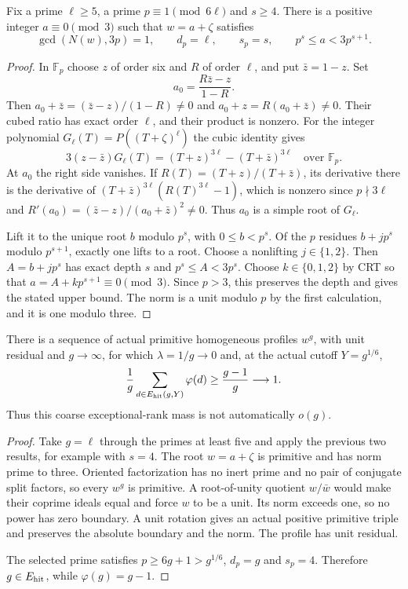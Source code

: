 \begin{theorem}\label{hr-depth}
Fix a prime $\ell\ge5$, a prime $p\equiv1\pmod{6\ell}$ and $s\ge4$.
There is a positive integer $a\equiv0\pmod3$ such that $w=a+\zeta$
satisfies
\[
 \gcd(N(w),3p)=1,\qquad d_p=\ell,\qquad s_p=s,
 \qquad p^s\le a<3p^{s+1}.
\]
\end{theorem}
\begin{proof}
In $\mathbb F_p$ choose $z$ of order six and $R$ of order $\ell$,
and put $\bar z=1-z$. Set
\[
 a_0=\frac{R\bar z-z}{1-R}.
\]
Then $a_0+\bar z=(\bar z-z)/(1-R)\ne0$ and
$a_0+z=R(a_0+\bar z)\ne0$. Their cubed ratio has exact order
$\ell$, and their product is nonzero. For the integer polynomial
$G_\ell(T)=P((T+\zeta)^\ell)$ the cubic identity gives
\[
 3(z-\bar z)G_\ell(T)=(T+z)^{3\ell}-(T+\bar z)^{3\ell}
 \quad\text{over }\mathbb F_p.
\]
At $a_0$ the right side vanishes. If $R(T)=(T+z)/(T+\bar z)$,
its derivative there is the derivative of
$(T+\bar z)^{3\ell}(R(T)^{3\ell}-1)$, which is nonzero since
$p\nmid3\ell$ and
$R'(a_0)=(\bar z-z)/(a_0+\bar z)^2\ne0$.
Thus $a_0$ is a simple root of $G_\ell$.

Lift it to the unique root $b$ modulo $p^s$, with $0\le b<p^s$.
Of the $p$ residues $b+jp^s$ modulo $p^{s+1}$, exactly one lifts
to a root. Choose a nonlifting $j\in\{1,2\}$. Then
$A=b+jp^s$ has exact depth $s$ and $p^s\le A<3p^s$.
Choose $k\in\{0,1,2\}$ by CRT so that
$a=A+kp^{s+1}\equiv0\pmod3$. Since $p>3$, this preserves the
depth and gives the stated upper bound. The norm is a unit modulo
$p$ by the first calculation, and it is one modulo three.
\end{proof}

\begin{theorem}\label{hr-sparsity}
There is a sequence of actual primitive homogeneous profiles $w^g$,
with unit residual and $g\to\infty$, for which $\lambda=1/g\to0$
and, at the actual cutoff $Y=g^{1/6}$,
\[
 \frac1g\sum_{d\in E_{\rm hit}(g,Y)}\varphi(d)
       \ge\frac{g-1}{g}\longrightarrow1.
\]
Thus this coarse exceptional-rank mass is not automatically $o(g)$.
\end{theorem}
\begin{proof}
Take $g=\ell$ through the primes at least five and apply the previous
two results, for example with $s=4$. The root $w=a+\zeta$ is
primitive and has norm prime to three. Oriented factorization has
no inert prime and no pair of conjugate split factors, so every
$w^g$ is primitive. A root-of-unity quotient $w/\bar w$ would make
their coprime ideals equal and force $w$ to be a unit. Its norm
exceeds one, so no power has zero boundary. A unit rotation gives
an actual positive primitive triple and preserves the absolute
boundary and the norm. The profile has unit residual.

The selected prime satisfies $p\ge6g+1>g^{1/6}$, $d_p=g$ and
$s_p=4$. Therefore $g\in E_{\rm hit}$, while $\varphi(g)=g-1$.
\end{proof}

